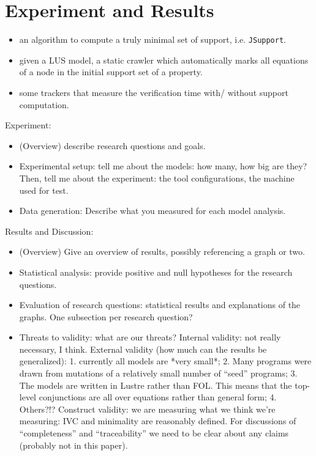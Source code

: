 \section{Experiment and Results}
\label{sec:exprm}

\begin{itemize}
    \item an algorithm to compute a truly minimal set of support, i.e. \texttt{JSupport}.
    \item given a LUS model, a static crawler which automatically marks all equations of a node in the initial support set of a property.
    \item some trackers that measure the verification time with/ without support computation.
\end{itemize}




Experiment:
\begin{itemize}
    \item (Overview) describe research questions and goals.
    \item Experimental setup: tell me about the models: how many, how big are they?  Then, tell me about the experiment: the tool configurations, the machine used for test.
    \item Data generation: Describe what you measured for each model analysis.
\end{itemize}

Results and Discussion:
\begin{itemize}
    \item (Overview) Give an overview of results, possibly referencing a graph or two.
    \item Statistical analysis: provide positive and null hypotheses for the research questions.
    \item Evaluation of research questions: statistical results and explanations of the graphs.  One subsection per research question?
    \item Threats to validity: what are our threats?
    Internal validity: not really necessary, I think.
    External validity (how much can the results be generalized):
        1. currently all models are *very small*;
        2. Many programs were drawn from mutations of a relatively small number of ``seed'' programs;
        3. The models are written in Lustre rather than FOL.  This means that the
            top-level conjunctions are all over equations rather than general
            form;
        4. Others?!?
    Construct validity: we are measuring what we think we're measuring: IVC and minimality are reasonably defined.  For discussions of ``completeness'' and ``traceability'' we need to be clear about any claims (probably not in this paper).
\end{itemize}

